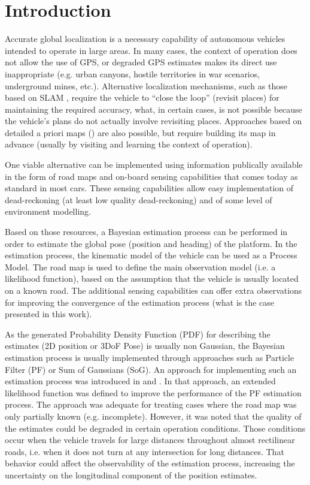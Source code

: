 \chapter{Introduction}
\label{cap:Introductions}

Accurate global localization is a necessary capability of autonomous vehicles intended to operate in large areas. In many cases, the context of operation does not allow the use of GPS, or degraded GPS estimates makes its direct use inappropriate (e.g. urban canyons, hostile territories in war scenarios, underground mines, etc.). Alternative localization mechanisms, such as those based on SLAM \cite{42montemerlo2007fastslam, 08weingarten2005ekf, 37auat2011optimized, 10thrun2006graph}, require the vehicle to “close the loop” (revisit places) for maintaining the required accuracy, what, in certain cases, is not possible because the vehicle’s plans do not actually involve revisiting places. Approaches based on detailed a priori maps (\cite{Thrun00j, Levinson-RSS-07, LevinsonT10, ranganathan2013light}) are also possible, but require building its map in advance (usually by visiting and learning the context of operation).

One viable alternative can be implemented using information publically available in the form of road maps and on-board sensing capabilities that comes today as standard in most cars. These sensing capabilities allow easy implementation of dead-reckoning (at least low quality dead-reckoning) and of some level of environment modelling.

Based on those resources, a Bayesian estimation process can be performed in order to estimate the global pose (position and heading) of the platform. In the estimation process, the kinematic model of the vehicle can be used as a Process Model. The road map is used to define the main observation model (i.e. a likelihood function), based on the assumption that the vehicle is usually located on a known road. The additional sensing capabilities can offer extra observations for improving the convergence of the estimation process (what is the case presented in this work).

As the generated Probability Density Function (PDF) for describing the estimates (2D position or 3DoF Pose) is usually non Gaussian, the Bayesian estimation process is usually implemented through approaches such as Particle Filter (PF) or Sum of Gaussians (SoG). An approach for implementing such an estimation process was introduced  in \cite{guivant2007global} and \cite{guivant2010robust}. In that approach, an extended likelihood function was defined to improve the performance of the PF estimation process. The approach was adequate for treating cases where the road map was only partially known (e.g. incomplete). However, it was noted that the quality of the estimates could be degraded in certain operation conditions. Those conditions occur when the vehicle travels for large distances throughout almost rectilinear roads, i.e. when it does not turn at any intersection for long distances. That behavior could affect the observability of the estimation process, increasing the uncertainty on the longitudinal component of the position estimates. 


